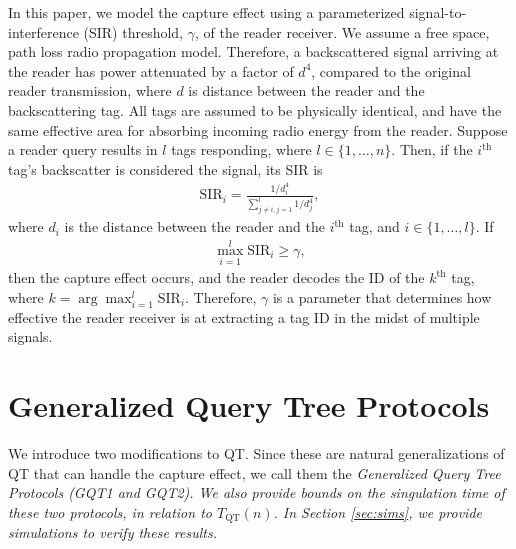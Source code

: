 \documentclass[conference]{IEEEtran}
\begin{document}
In this paper, we model the capture effect using a parameterized signal-to-interference (SIR) threshold, $\gamma$, of the reader receiver.  We assume a free space, path loss radio propagation model.  Therefore, a backscattered signal arriving at the reader has power attenuated by a factor of $d^4$, compared to the original reader transmission, where $d$ is distance between the reader and the backscattering tag.  All tags are assumed to be physically identical, and have the same effective area for absorbing incoming radio energy from the reader.  Suppose a reader query results in $l$ tags responding, where $l \in \{1, \ldots, n\}$.  Then, if the $i^{\mbox{th}}$ tag's backscatter is considered the signal, its SIR is
\begin{eqnarray}
\mbox{SIR}_i = \frac{1/d_i^4}{ \displaystyle \sum_{j \ne i, j = 1}^{l} 1/d_j^4},
\end{eqnarray}
where $d_i$ is the distance between the reader and the $i^{\mbox{th}}$ tag, and $i \in \{1, \ldots, l\}$.  If
\begin{eqnarray}
\max_{i=1}^l \mbox{SIR}_i \geq \gamma,
\end{eqnarray}
then the capture effect occurs, and the reader decodes the ID of the $k^{\mbox{th}}$ tag, where $k = \arg \max_{i=1}^l \mbox{SIR}_i$.  Therefore, $\gamma$ is a parameter that determines how effective the reader receiver is at extracting a tag ID in the midst of multiple signals.

\section{Generalized Query Tree Protocols}
\label{sec:gqt}
We introduce two modifications to QT.  Since these are natural generalizations of QT that can handle the capture effect, we call them the \em Generalized Query Tree Protocols \em (GQT1 and GQT2).  We also provide bounds on the singulation time of these two protocols, in relation to $T_{\mbox{QT}}\left(n\right)$.  In Section \ref{sec:sims}, we provide simulations to verify these results.
\end{document}
